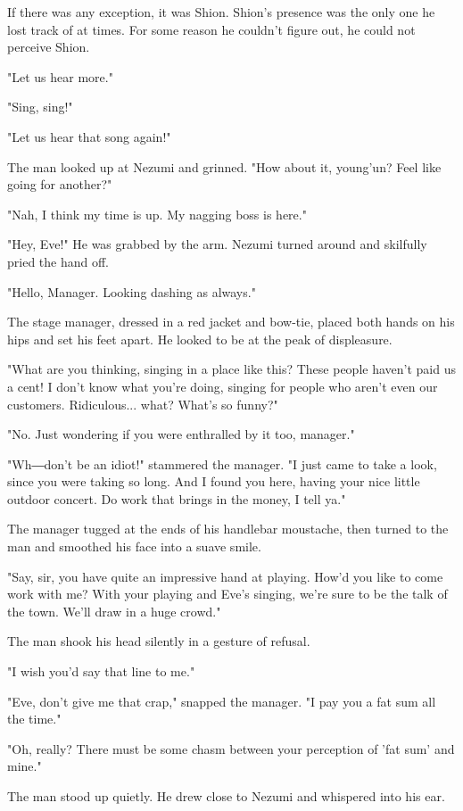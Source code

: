 If there was any exception, it was Shion. Shion's presence was the only
one he lost track of at times. For some reason he couldn't figure out,
he could not perceive Shion.

"Let us hear more."

"Sing, sing!"

"Let us hear that song again!"

The man looked up at Nezumi and grinned. "How about it, young'un? Feel
like going for another?"

"Nah, I think my time is up. My nagging boss is here."

"Hey, Eve!" He was grabbed by the arm. Nezumi turned around and
skilfully pried the hand off.

"Hello, Manager. Looking dashing as always."

The stage manager, dressed in a red jacket and bow-tie, placed both
hands on his hips and set his feet apart. He looked to be at the peak of
displeasure.

"What are you thinking, singing in a place like this? These people
haven't paid us a cent! I don't know what you're doing, singing for
people who aren't even our customers. Ridiculous... what? What's so
funny?"

"No. Just wondering if you were enthralled by it too, manager."

"Wh―don't be an idiot!" stammered the manager. "I just came to take a
look, since you were taking so long. And I found you here, having your
nice little outdoor concert. Do work that brings in the money, I tell
ya."

The manager tugged at the ends of his handlebar moustache, then turned
to the man and smoothed his face into a suave smile.

"Say, sir, you have quite an impressive hand at playing. How'd you like
to come work with me? With your playing and Eve's singing, we're sure to
be the talk of the town. We'll draw in a huge crowd."

The man shook his head silently in a gesture of refusal.

"I wish you'd say that line to me."

"Eve, don't give me that crap," snapped the manager. "I pay you a fat
sum all the time."

"Oh, really? There must be some chasm between your perception of 'fat
sum' and mine."

The man stood up quietly. He drew close to Nezumi and whispered into his
ear.

